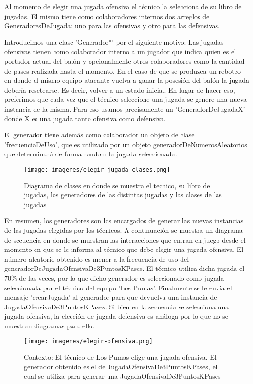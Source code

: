 Al momento de elegir una jugada ofensiva el técnico la selecciona de su libro de jugadas. El mismo tiene como colaboradores internos dos arreglos de 
GeneradoresDeJugada: uno para las ofensivas y otro para las defensivas. 

Introducimos una clase 'Generador*' por el siguiente motivo:
Las jugadas ofensivas tienen como colaborador interno a un jugador que indica quien es el portador actual del balón y opcionalmente otros colaboradores como la
cantidad de pases realizada hasta el momento. En el caso de que se produzca un reboteo en donde el mismo equipo 
atacante vuelva a ganar la posesión del balón la jugada debería resetearse. Es decir, volver a un estado inicial. 
En lugar de hacer eso, preferimos que cada vez que el técnico seleccione una jugada se genere una nueva instancia de la misma.
Para eso usamos precisamente un 'GeneradorDeJugadaX' donde X es una jugada tanto ofensiva como defensiva.

El generador tiene además como colaborador un objeto de clase 'frecuenciaDeUso', que es utilizado por un objeto generadorDeNumerosAleatorios que determinará 
de forma random la jugada seleccionada.

\begin{figure}[h!]
   \texttt{[image: imagenes/elegir-jugada-clases.png]}
   \caption{Diagrama de clases en donde se muestra el tecnico, su libro de jugadas, los generadores de las distintas jugadas y las clases de las jugadas}
\end{figure}

En resumen, los generadores son los encargados de generar las nuevas instancias de las jugadas elegidas por los técnicos. A continuación se muestra un diagrama
de secuencia en donde se muestran las interacciones que entran en juego desde el momento en que se le informa al técnico que debe elegir una jugada ofensiva.
El número aleatorio obtenido es menor a la frecuencia de uso del generadorDeJugadaOfensivaDe3PuntosKPases. El técnico utiliza dicha jugada el 70\% de las veces,
por lo que dicho generador es seleccionado
como jugada seleccionada por el técnico del equipo 'Los Pumas'. Finalmente se le envía el mensaje 'crearJugada' al generador para que devuelva una instancia
de JugadaOfensivaDe3PuntosKPases.
Si bien en la secuencia se selecciona una jugada ofensiva, la elección de jugada defensiva es análoga por lo que no se muestran diagramas para ello.

\newpage
\begin{landscape}

\begin{figure}[h!]
   \texttt{[image: imagenes/elegir-ofensiva.png]}
   \caption{Contexto: El técnico de Los Pumas elige una jugada ofensiva. El generador obtenido es el de JugadaOfensivaDe3PuntosKPases, el cual se utiliza para
   generar una JugadaOfensivaDe3PuntosKPases}
\end{figure}

\end{landscape}
\newpage

